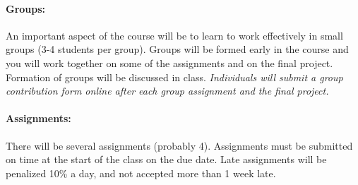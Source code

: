 \documentclass[12pt]{article}
\begin{document}
\paragraph*{Groups:} An important aspect of the course will be to learn to work effectively in small groups (3-4 students per group).  Groups will be formed early in the course and you will work together on some of the assignments and on the final project.  Formation of groups will be discussed in class.  \emph{Individuals will submit a group contribution form online after each group assignment and the final project.}

\paragraph*{Assignments:} There will be several assignments (probably 4).  Assignments must be submitted on time at the start of the class on the due date.  Late assignments will be penalized 10\% a day, and not accepted more than 1 week late.
\end{document}
